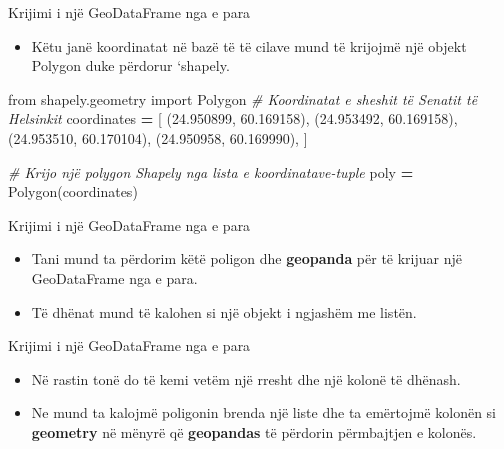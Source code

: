 \documentclass[
  ignorenonframetext,
]{beamer}
\newenvironment{Shaded}{\begin{snugshade}}{\end{snugshade}}
\newcommand{\CommentTok}[1]{\textcolor[rgb]{0.56,0.35,0.01}{\textit{#1}}}
\newcommand{\FloatTok}[1]{\textcolor[rgb]{0.00,0.00,0.81}{#1}}
\newcommand{\ImportTok}[1]{#1}
\newcommand{\NormalTok}[1]{#1}
\newcommand{\OperatorTok}[1]{\textcolor[rgb]{0.81,0.36,0.00}{\textbf{#1}}}
\providecommand{\tightlist}{%
  \setlength{\itemsep}{0pt}\setlength{\parskip}{0pt}}
\begin{document}
\begin{frame}[fragile]{Krijimi i një GeoDataFrame nga e para}
\protect\hypertarget{krijimi-i-njuxeb-geodataframe-nga-e-para-2}{}
\begin{itemize}
\tightlist
\item
  Këtu janë koordinatat në bazë të të cilave mund të krijojmë një objekt
  Polygon duke përdorur `shapely.
\end{itemize}


\begin{Shaded}
\begin{Highlighting}[]
\ImportTok{from}\NormalTok{ shapely.geometry }\ImportTok{import}\NormalTok{ Polygon}
\CommentTok{\# Koordinatat e sheshit të Senatit të Helsinkit}
\NormalTok{coordinates }\OperatorTok{=}\NormalTok{ [}
\NormalTok{    (}\FloatTok{24.950899}\NormalTok{, }\FloatTok{60.169158}\NormalTok{),}
\NormalTok{    (}\FloatTok{24.953492}\NormalTok{, }\FloatTok{60.169158}\NormalTok{),}
\NormalTok{    (}\FloatTok{24.953510}\NormalTok{, }\FloatTok{60.170104}\NormalTok{),}
\NormalTok{    (}\FloatTok{24.950958}\NormalTok{, }\FloatTok{60.169990}\NormalTok{),}
\NormalTok{]}

\CommentTok{\# Krijo një polygon Shapely nga lista e koordinatave{-}tuple}
\NormalTok{poly }\OperatorTok{=}\NormalTok{ Polygon(coordinates)}
\end{Highlighting}
\end{Shaded}
\end{frame}

\begin{frame}{Krijimi i një GeoDataFrame nga e para}
\protect\hypertarget{krijimi-i-njuxeb-geodataframe-nga-e-para-3}{}
\begin{itemize}
\item
  Tani mund ta përdorim këtë poligon dhe \textbf{geopanda} për të
  krijuar një GeoDataFrame nga e para.
\item
  Të dhënat mund të kalohen si një objekt i ngjashëm me listën.
\end{itemize}
\end{frame}

\begin{frame}{Krijimi i një GeoDataFrame nga e para}
\protect\hypertarget{krijimi-i-njuxeb-geodataframe-nga-e-para-4}{}
\begin{itemize}
\item
  Në rastin tonë do të kemi vetëm një rresht dhe një kolonë të dhënash.
\item
  Ne mund ta kalojmë poligonin brenda një liste dhe ta emërtojmë kolonën
  si \textbf{geometry} në mënyrë që \textbf{geopandas} të përdorin
  përmbajtjen e kolonës.
\end{itemize}
\end{frame}
\end{document}
